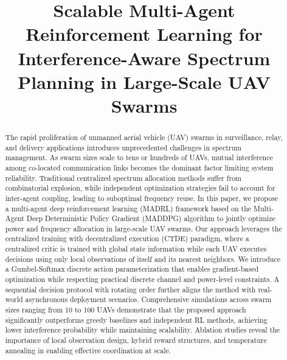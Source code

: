 \documentclass[conference]{IEEEtran}
\begin{document}
\title{Scalable Multi-Agent Reinforcement Learning for Interference-Aware Spectrum Planning in Large-Scale UAV Swarms}

\author{
}

\maketitle

\begin{abstract}
The rapid proliferation of unmanned aerial vehicle (UAV) swarms in surveillance, relay, and delivery applications introduces unprecedented challenges in spectrum management. As swarm sizes scale to tens or hundreds of UAVs, mutual interference among co-located communication links becomes the dominant factor limiting system reliability. Traditional centralized spectrum allocation methods suffer from combinatorial explosion, while independent optimization strategies fail to account for inter-agent coupling, leading to suboptimal frequency reuse. In this paper, we propose a multi-agent deep reinforcement learning (MADRL) framework based on the Multi-Agent Deep Deterministic Policy Gradient (MADDPG) algorithm to jointly optimize power and frequency allocation in large-scale UAV swarms. Our approach leverages the centralized training with decentralized execution (CTDE) paradigm, where a centralized critic is trained with global state information while each UAV executes decisions using only local observations of itself and its nearest neighbors. We introduce a Gumbel-Softmax discrete action parameterization that enables gradient-based optimization while respecting practical discrete channel and power-level constraints. A sequential decision protocol with rotating order further aligns the method with real-world asynchronous deployment scenarios. Comprehensive simulations across swarm sizes ranging from 10 to 100 UAVs demonstrate that the proposed approach significantly outperforms greedy baselines and independent RL methods, achieving lower interference probability while maintaining scalability. Ablation studies reveal the importance of local observation design, hybrid reward structures, and temperature annealing in enabling effective coordination at scale.
\end{abstract}
\end{document}
